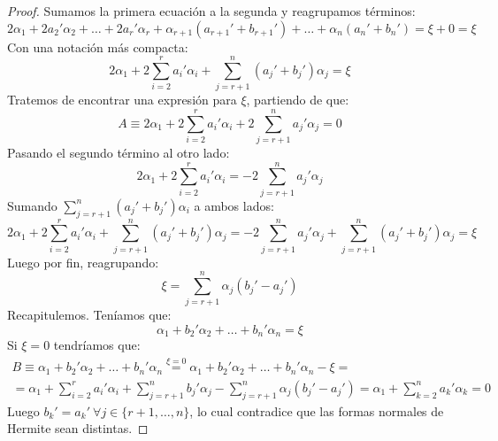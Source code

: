 \begin{proof}
	Sumamos la primera ecuación a la segunda y reagrupamos términos:
	\[2\alpha_1+2a_2'\alpha_2+\dots+2a_r'\alpha_r+\alpha_{r+1}(a_{r+1}'+b_{r+1}')+\dots+\alpha_n(a_n'+b_n')=\xi+0=\xi\]
	Con una notación más compacta:
	\[2\alpha_1+2\sum_{i=2}^{r}a_i'\alpha_i+\sum_{j=r+1}^{n}(a_j'+b_j')\alpha_j=\xi\]
	Tratemos de encontrar una expresión para $\xi$, partiendo de que:
	\[ A\equiv2\alpha_1+2\sum_{i=2}^{r}a_i'\alpha_i+2\sum_{j=r+1}^{n}a_j'\alpha_j=0\]
	Pasando el segundo término al otro lado:
	\[2\alpha_1+2\sum_{i=2}^{r}a_i'\alpha_i=-2\sum_{j=r+1}^{n}a_j'\alpha_j\]
	Sumando $\sum_{j=r+1}^{n}(a_j'+b_j')\alpha_i$ a ambos lados:
	\[2\alpha_1+2\sum_{i=2}^{r}a_i'\alpha_i+\sum_{j=r+1}^{n}(a_j'+b_j')\alpha_j=-2\sum_{j=r+1}^{n}a_j'\alpha_j+\sum_{j=r+1}^{n}(a_j'+b_j')\alpha_j=\xi\]
	Luego por fin, reagrupando:
	\[\xi=\sum_{j=r+1}^{n}\alpha_{j}(b_{j}'-a_{j}')\]
	Recapitulemos. Teníamos que:
	\[\alpha_1+b_2'\alpha_2+\dots+b_n'\alpha_n=\xi\]
	Si $\xi=0$ tendríamos que:
	\begin{multline*}B\equiv\alpha_1+b_2'\alpha_2+\dots+b_n'\alpha_n\stackrel{\xi=0}{=}\alpha_1+b_2'\alpha_2+\dots+b_n'\alpha_n-\xi=\\ =\alpha_1+\sum_{i=2}^{r}a_i'\alpha_i+\sum_{j=r+1}^{n}b_j'\alpha_j-\sum_{j=r+1}^{n}\alpha_{j}(b_{j}'-a_{j}')=\alpha_1+\sum_{k=2}^{n}a_k'\alpha_k=0\end{multline*}
	Luego $b_k'=a_k'\ \forall j\in\{r+1,\dots,n\}$, lo cual contradice que las formas normales de Hermite sean distintas.
\end{proof}
